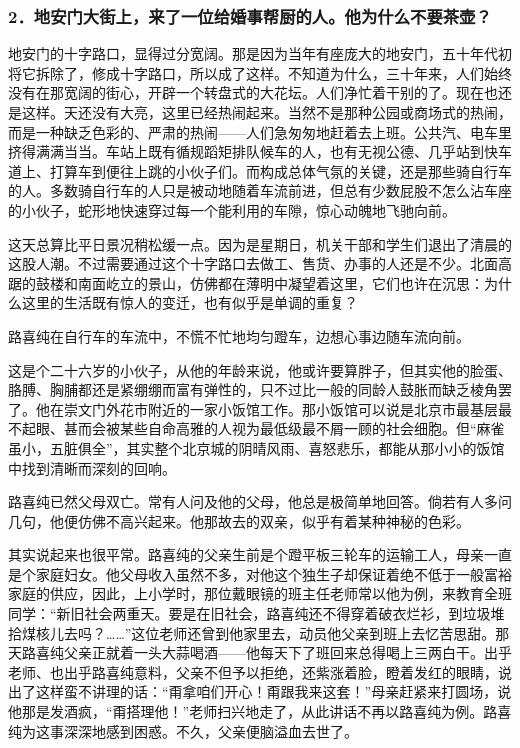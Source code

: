 \subsubsection*{2．地安门大街上，来了一位给婚事帮厨的人。他为什么不要茶壶？}
\par 地安门的十字路口，显得过分宽阔。那是因为当年有座庞大的地安门，五十年代初将它拆除了，修成十字路口，所以成了这样。不知道为什么，三十年来，人们始终没有在那宽阔的街心，开辟一个转盘式的大花坛。人们净忙着干别的了。现在也还是这样。天还没有大亮，这里已经热闹起来。当然不是那种公园或商场式的热闹，而是一种缺乏色彩的、严肃的热闹——人们急匆匆地赶着去上班。公共汽、电车里挤得满满当当。车站上既有循规蹈矩排队候车的人，也有无视公德、几乎站到快车道上、打算车到便往上跳的小伙子们。而构成总体气氛的关键，还是那些骑自行车的人。多数骑自行车的人只是被动地随着车流前进，但总有少数屁股不怎么沾车座的小伙子，蛇形地快速穿过每一个能利用的车隙，惊心动魄地飞驰向前。
\par 这天总算比平日景况稍松缓一点。因为是星期日，机关干部和学生们退出了清晨的这股人潮。不过需要通过这个十字路口去做工、售货、办事的人还是不少。北面高踞的鼓楼和南面屹立的景山，仿佛都在薄明中凝望着这里，它们也许在沉思：为什么这里的生活既有惊人的变迁，也有似乎是单调的重复？
\par 路喜纯在自行车的车流中，不慌不忙地均匀蹬车，边想心事边随车流向前。
\par 这是个二十六岁的小伙子，从他的年龄来说，他或许要算胖子，但其实他的脸蛋、胳膊、胸脯都还是紧绷绷而富有弹性的，只不过比一般的同龄人鼓胀而缺乏棱角罢了。他在崇文门外花市附近的一家小饭馆工作。那小饭馆可以说是北京市最基层最不起眼、甚而会被某些自命高雅的人视为最低级最不屑一顾的社会细胞。但“麻雀虽小，五脏俱全”，其实整个北京城的阴晴风雨、喜怒悲乐，都能从那小小的饭馆中找到清晰而深刻的回响。
\par 路喜纯已然父母双亡。常有人问及他的父母，他总是极简单地回答。倘若有人多问几句，他便仿佛不高兴起来。他那故去的双亲，似乎有着某种神秘的色彩。
\par 其实说起来也很平常。路喜纯的父亲生前是个蹬平板三轮车的运输工人，母亲一直是个家庭妇女。他父母收入虽然不多，对他这个独生子却保证着绝不低于一般富裕家庭的供应，因此，上小学时，那位戴眼镜的班主任老师常以他为例，来教育全班同学：“新旧社会两重天。要是在旧社会，路喜纯还不得穿着破衣烂衫，到垃圾堆拾煤核儿去吗？……”这位老师还曾到他家里去，动员他父亲到班上去忆苦思甜。那天路喜纯父亲正就着一头大蒜喝酒——他每天下了班回来总得喝上三两白干。出乎老师、也出乎路喜纯意料，父亲不但予以拒绝，还紫涨着脸，瞪着发红的眼睛，说出了这样蛮不讲理的话：“甭拿咱们开心！甭跟我来这套！”母亲赶紧来打圆场，说他那是发酒疯，“甭搭理他！”老师扫兴地走了，从此讲话不再以路喜纯为例。路喜纯为这事深深地感到困惑。不久，父亲便脑溢血去世了。
